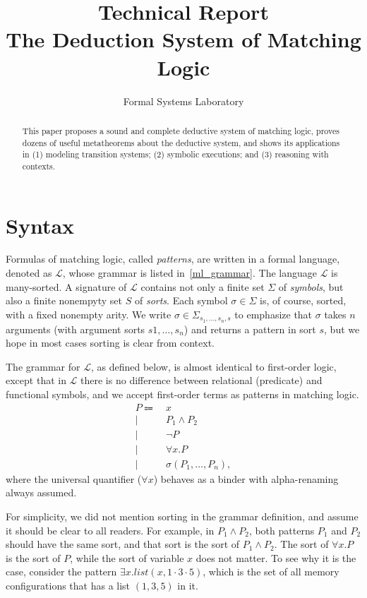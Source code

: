 \documentclass{article}
\title{Technical Report\\ 
	   The Deduction System of Matching Logic}
\author[1]{Formal Systems Laboratory}
\affil[1]{University of Illinois, Urbana-Champaign, USA}
\theoremstyle{plain}
\begin{document}
\maketitle

\begin{abstract}

This paper proposes a sound and complete deductive system of matching logic, proves dozens of useful metatheorems about the deductive system, and shows its applications in (1) modeling transition systems; (2) symbolic executions; and (3) reasoning with contexts.

\end{abstract}

\section{Syntax}

Formulas of matching logic, called \emph{patterns}, are written in a formal language, denoted as $\mathcal{L}$, whose grammar is listed in~\eqref{ml_grammar}. The language $\mathcal{L}$ is many-sorted. A signature of $\mathcal{L}$ contains not only a finite set $\Sigma$ of \emph{symbols}, but also a finite nonempyty set $S$ of \emph{sorts}. Each symbol $\sigma \in \Sigma$ is, of course, sorted, with a fixed nonempty arity. We write $\sigma \in \Sigma_{s_1,\dots,s_n,s}$ to emphasize that $\sigma$ takes $n$ arguments (with argument sorts $s1,\dots,s_n$) and returns a pattern in sort $s$, but we hope in most cases sorting is clear from context.

The grammar for $\mathcal{L}$, as defined below, is almost identical to first-order logic, except that in $\mathcal{L}$ there is no difference between relational (predicate) and functional symbols, and we accept first-order terms as patterns in matching logic. 
\begin{align}
\label{ml_grammar}
P \Coloneqq\  & x \\
       \mid\  & P_1 \wedge P_2 \nonumber \\
       \mid\  & \neg P \nonumber \\
       \mid\  & \forall x . P \nonumber \\
       \mid\  & \sigma(P_1,\dots,P_n), \nonumber
\end{align}
where the universal quantifier ($\forall x$) behaves as a binder with alpha-renaming always assumed.

For simplicity, we did not mention sorting in the grammar definition, and assume it should be clear to all readers. For example, in $P_1 \wedge P_2$, both patterns $P_1$ and $P_2$ should have the same sort, and that sort is the sort of $P_1 \wedge P_2$. The sort of $\forall x . P$ is the sort of $P$, while the sort of variable $x$ does not matter. To see why it is the case, consider the pattern $\exists x . list(x, 1 \cdot 3 \cdot 5)$, which is the set of all memory configurations that has a list $(1,3,5)$ in it.
\end{document}
